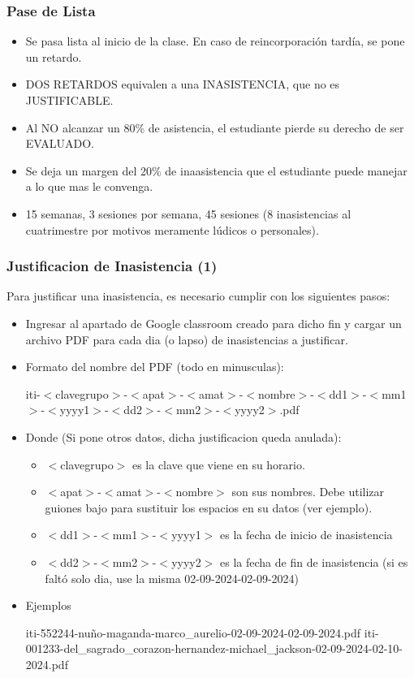 \begin{frame}
\frametitle{Pase de Lista}
\begin{itemize}
\item Se pasa lista al inicio de la clase. En caso de reincorporaci\'on tard\'ia, se pone un retardo.
\item DOS RETARDOS equivalen a una INASISTENCIA, que no es JUSTIFICABLE.
\end{itemize}
\begin{itemize}
\item Al NO alcanzar un 80\% de asistencia, el estudiante pierde su derecho de ser EVALUADO.
\item Se deja un margen del 20\% de inaasistencia que el estudiante puede manejar a lo que mas le convenga.
\item 15 semanas, 3 sesiones por semana, 45 sesiones (8 inasistencias al cuatrimestre por motivos meramente lúdicos o personales).    
\end{itemize}
\end{frame}


\begin{frame}
\frametitle{Justificacion de Inasistencia (1)}
Para justificar una inasistencia, es necesario cumplir con los siguientes pasos:
\begin{itemize}	 
\item Ingresar al apartado de Google classroom creado para dicho fin y cargar un archivo PDF para cada dia (o lapso) de inasistencias a justificar. 
\item Formato del nombre del PDF (todo en minusculas):

\tiny{iti-$<$clavegrupo$>$-$<$apat$>$-$<$amat$>$-$<$nombre$>$-$<$dd1$>$-$<$mm1$>$-$<$yyyy1$>$-$<$dd2$>$-$<$mm2$>$-$<$yyyy2$>$.pdf}
\normalsize
\item Donde (Si pone otros datos, dicha justificacion queda anulada):
\begin{itemize}
\item \scriptsize{$<$clavegrupo$>$} es la clave que viene en su horario. 
\item \scriptsize{$<$apat$>$-$<$amat$>$-$<$nombre$>$} son sus nombres.  Debe utilizar guiones bajo para sustituir los espacios en su datos (ver ejemplo). 
\item \scriptsize{$<$dd1$>$-$<$mm1$>$-$<$yyyy1$>$} es la fecha de inicio de inasistencia 
\item \scriptsize{$<$dd2$>$-$<$mm2$>$-$<$yyyy2$>$} es la fecha de fin de inasistencia (si es faltó solo dia, use la misma 02-09-2024-02-09-2024)
\end{itemize}
\item Ejemplos

\scriptsize{iti-552244-nuño-maganda-marco\_aurelio-02-09-2024-02-09-2024.pdf}
\scriptsize{iti-001233-del\_sagrado\_corazon-hernandez-michael\_jackson-02-09-2024-02-10-2024.pdf}
\normalsize
\end{itemize}
\end{frame}


